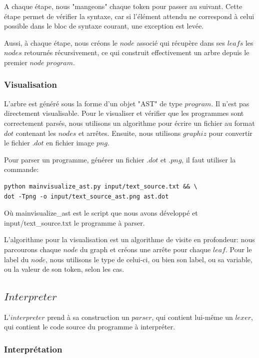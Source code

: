 \documentclass[a4paper]{article}
\begin{document}
A chaque étape, nous "mangeons" chaque token pour passer au suivant. Cette étape permet de vérifier la syntaxe, car si l'élément attendu ne correspond à celui possible dans le bloc de syntaxe courant, une exception est levée. 

Aussi, à chaque étape, nous créons le $node$ associé qui récupère dans ses $leafs$ les $nodes$ retournés récursivement, ce qui construit effectivement un arbre depuis le premier $node$ $program$. 

\subsubsection{Visualisation}

L'arbre est généré sous la forme d'un objet "AST" de type $program$. Il n'est pas directement visualisable. Pour le visualiser et vérifier que les programmes sont correctement parsés, nous utilisons un algorithme pour écrire un fichier au format $dot$ contenant les $nodes$ et arrêtes. Ensuite, nous utilisons $graphiz$ pour convertir le fichier $.dot$ en fichier image $png$. 

Pour parser un programme, générer un fichier $.dot$ et $.png$, il faut utiliser la commande: 
\begin{verbatim}
python mainvisualize_ast.py input/text_source.txt && \
dot -Tpng -o input/text_source_ast.png ast.dot
\end{verbatim}

Où mainvisualize\_ast est le script que nous avons développé et input/text\_source.txt le programme à parser. 

L’algorithme pour la visualisation est un algorithme de visite en profondeur: nous parcourons chaque $node$ du graph et créons une arrête pour chaque $leaf$. Pour le label du $node$, nous utilisons le type de celui-ci, ou bien son label, ou sa variable, ou la valeur de son token, selon les cas.  

\subsection{$Interpreter$}

L'$interpreter$ prend à sa construction un $parser$, qui contient lui-même un $lexer$, qui contient le code source du programme à interpréter. 

\subsubsection{Interprétation}
\end{document}
